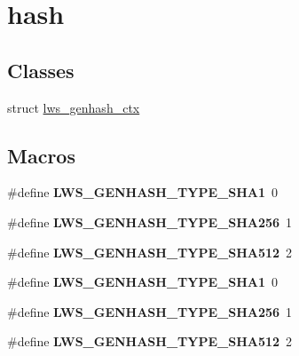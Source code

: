 \hypertarget{group__generic}{}\section{hash}
\label{group__generic}
\subsection*{Classes}
\begin{DoxyCompactItemize}
\item 
struct \hyperlink{structlws__genhash__ctx}{lws\+\_\+genhash\+\_\+ctx}
\end{DoxyCompactItemize}
\subsection*{Macros}
\begin{DoxyCompactItemize}
\item 
\mbox{\label{group__generic_gaf79ee123a42ff29b1ab52b5ef02c0825}} 
\#define {\bfseries L\+W\+S\+\_\+\+G\+E\+N\+H\+A\+S\+H\+\_\+\+T\+Y\+P\+E\+\_\+\+S\+H\+A1}~0
\item 
\mbox{\label{group__generic_gaf1a9c0afabf5a3ad37746a6d499e19a0}} 
\#define {\bfseries L\+W\+S\+\_\+\+G\+E\+N\+H\+A\+S\+H\+\_\+\+T\+Y\+P\+E\+\_\+\+S\+H\+A256}~1
\item 
\mbox{\label{group__generic_ga90cb67a0ac4feb75c735041c2c1b4c4d}} 
\#define {\bfseries L\+W\+S\+\_\+\+G\+E\+N\+H\+A\+S\+H\+\_\+\+T\+Y\+P\+E\+\_\+\+S\+H\+A512}~2
\item 
\mbox{\label{group__generic_gaf79ee123a42ff29b1ab52b5ef02c0825}} 
\#define {\bfseries L\+W\+S\+\_\+\+G\+E\+N\+H\+A\+S\+H\+\_\+\+T\+Y\+P\+E\+\_\+\+S\+H\+A1}~0
\item 
\mbox{\label{group__generic_gaf1a9c0afabf5a3ad37746a6d499e19a0}} 
\#define {\bfseries L\+W\+S\+\_\+\+G\+E\+N\+H\+A\+S\+H\+\_\+\+T\+Y\+P\+E\+\_\+\+S\+H\+A256}~1
\item 
\mbox{\label{group__generic_ga90cb67a0ac4feb75c735041c2c1b4c4d}} 
\#define {\bfseries L\+W\+S\+\_\+\+G\+E\+N\+H\+A\+S\+H\+\_\+\+T\+Y\+P\+E\+\_\+\+S\+H\+A512}~2
\item 
\mbox{\label{group__generic_gaf79ee123a42ff29b1ab52b5ef02c0825}} 

\end{DoxyCompactItemize}
